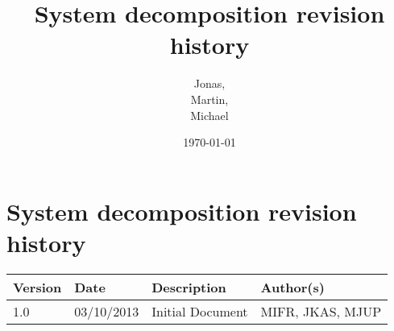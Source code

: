 \documentclass[12pt,a4paper] {report}
\author{Jonas,\\Martin,\\Michael}
\title{System decomposition revision history}
\date{\today}
\begin{document}
	\long{}

\chapter{System decomposition revision history}
\label{sec:current system}

\begin{center}
    \begin{tabular}{ | l | l | p{6cm} | p{4cm} |}
    \hline
    Version & Date & Description & Author(s) \\ \hline
    1.0 & 03/10/2013 & Initial Document & MIFR, JKAS, MJUP
    \\ \hline
    \end{tabular}
\end{center}
\end{document}
